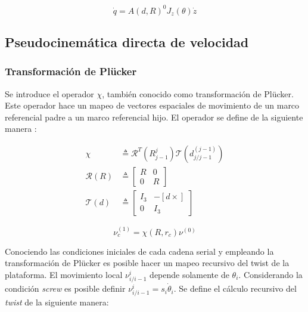 \begin{equation} \label{eq: q_twist}
\dot{q} = A(d,R)^0J_z(\theta) \dot{z}
\end{equation}

\subsection{Pseudocinemática directa de velocidad}

\subsubsection{Transformación de Plücker}

Se introduce el operador $\chi$, 
también conocido como transformación de Plücker.
Este operador hace un mapeo de vectores 
espaciales de movimiento de un marco referencial padre a un 
marco referencial hijo.
El operador se define de la siguiente manera \cite{olguin20183d}:

\begin{subequations}
 \begin{align}
  \chi & \triangleq \mathcal R^T(R_{j-1}^j) \mathcal T(d_{j/j-1}^{(j-1)})\label{eq: chi operator}\\
  \mathcal R(R) & \triangleq \begin{bmatrix}
                              R & 0\\
                              0 & R
                             \end{bmatrix}\\
  \mathcal T(  d) & \triangleq   \begin{bmatrix}
                                        I_3 & -[  d \times]\\
                                        0 & I_3
                                      \end{bmatrix}
 \end{align}
\end{subequations}

\begin{equation}\label{eq: plucker mapping}
 \nu_c^{(1)} = \chi(R, r_c) \nu^{(0)}
\end{equation}


Conociendo las condiciones iniciales de cada cadena serial
y empleando la transformación de Plücker
es posible hacer un mapeo recursivo del twist
de la plataforma.
El movimiento local 
$\nu_{i/i-1}^{i}$ depende solamente de 
$  \theta_i$.
Considerando la condición \emph{screw}
es posible definir 
$\nu_{i/i-1}^{i} = s_i \dot{\theta}_i$.
Se define el cálculo recursivo del \emph{twist} 
de la siguiente manera:

